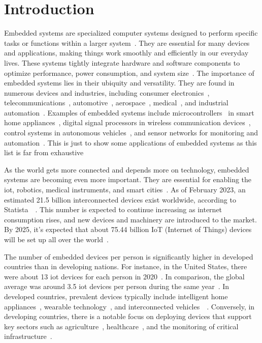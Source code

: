 
\vspace{21.5pt}
\chapter{Introduction}\label{sec:sec_introduction}

Embedded systems are specialized computer systems designed to perform specific tasks or functions
within a larger system~\cite{muench2018you}. They are essential for many devices
and applications, making things work smoothly and efficiently in our everyday
lives. These systems tightly integrate hardware and software components to optimize performance,
power consumption, and system size~\cite{eisele2022embedded}. The importance of embedded systems
lies in their ubiquity and versatility. They are found in numerous devices and industries,
including consumer electronics~\cite{andrae2010life}, telecommunications~\cite{paulin1995dsp},
automotive~\cite{Automoti68:online}, aerospace~\cite{bieber2012security},
medical~\cite{jafari2007medical}, and industrial automation~\cite{thramboulidis2007soa}.
Examples of embedded systems include microcontrollers~\cite{gridling2007introduction} in
smart home appliances~\cite{kang2017enhanced}, digital signal processors in wireless
communication devices~\cite{kostic1997digital}, control systems in autonomous
vehicles~\cite{kostic1997digital}, and sensor networks for monitoring and
automation~\cite{marwedel2021embedded}. This is just to show some applications of
embedded systems as this list is far from exhaustive


As the world gets more connected and depends more on technology, embedded
systems are becoming even more important. They are essential for
enabling the \gls{iot}, robotics, medical instruments, and smart cities~\cite{camposano1996embedded:ARTICLE}.
As of February 2023, an estimated 21.5 billion interconnected devices
exist worldwide, according to Statista~\cite{IoTconne16:online}~\cite{HowManyI1:online}.
This number is expected to continue increasing as internet consumption rises, and
new devices and machinery are introduced to the market. By 2025, it's expected
that about 75.44 billion IoT (Internet of Things) devices will be set up all
over the world~\cite{HowManyI1:online}.

The number of embedded devices per person is significantly higher in developed
countries than in developing nations. For instance, in
the United States, there were about 13 \acrshort{iot} devices for each
person in 2020~\cite{Stateoft48:online}.
In comparison, the global average was around 3.5 \acrshort{iot} devices per person during
the same year~\cite{CiscoAnn1:online}. In developed countries, prevalent devices
typically include intelligent home appliances~\cite{wang2015anycontrol},
wearable technology~\cite{poongodi2020wearable}, and
interconnected vehicles~\cite{priyan2019survey}~\cite{Internet36:online}.
Conversely, in developing countries, there is a notable focus on deploying
devices that support key sectors such as
agriculture~\cite{baranwal2016development}, healthcare~\cite{pradhan2021iot},
and the monitoring of critical infrastructure~\cite{patil2012internet}.

